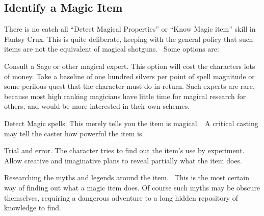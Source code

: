 \subsection{Identify a Magic Item}
There is no catch all “Detect Magical Properties” or “Know Magic item” skill in Fantsy Crux. This is quite deliberate, keeping with the general policy that such items are not the equivalent of magical shotguns.  Some options are:

Consult a Sage or other magical expert. This option will cost the characters lots of money. Take a baseline of one hundred silvers per point of spell magnitude or some perilous quest that the character must do in return. Such experts are rare, because most high ranking magicians have little time for magical research for others, and would be more interested in their own schemes. 

Detect Magic spells. This merely tells you the item is magical.  A critical casting may tell the caster how powerful the item is.

Trial and error. The character tries to find out the item’s use by experiment. Allow creative and imaginative plans to reveal partially what the item does.

Researching the myths and legends around the item.  This is the most certain way of finding out what a magic item does. Of course such myths may be obscure themselves, requiring a dangerous adventure to a long hidden repository of knowledge to find.

\vspace{6em}

